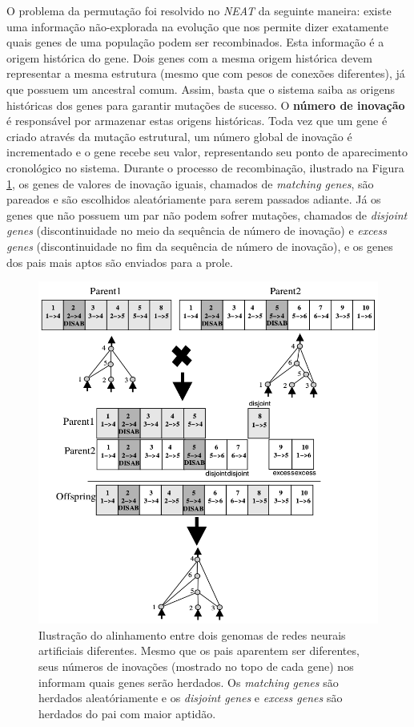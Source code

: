 O problema da permutação foi resolvido no \textit{NEAT} da seguinte maneira:
existe uma informação não-explorada na evolução que nos permite dizer exatamente
quais genes de uma população podem ser recombinados. Esta informação é a origem
histórica do gene. Dois genes com a mesma origem histórica devem representar a
mesma estrutura (mesmo que com pesos de conexões diferentes), já que possuem um
ancestral comum. Assim, basta que o sistema saiba as origens históricas dos
genes para garantir mutações de sucesso.  O \textbf{número de inovação} é
responsável por armazenar estas origens históricas.  Toda vez que um gene é
criado através da mutação estrutural, um número global de inovação é
incrementado e o gene recebe seu valor, representando seu ponto de aparecimento
cronológico no sistema.  Durante o processo de recombinação, ilustrado na Figura
\ref{fig:neat-innovation-matchup}, os genes de valores de inovação iguais,
chamados de \textit{matching genes}, são pareados e são escolhidos
aleatóriamente para serem passados adiante. Já os genes que não possuem um par
não podem sofrer mutações, chamados de \textit{disjoint genes} (discontinuidade
no meio da sequência de número de inovação) e \textit{excess genes}
(discontinuidade no fim da sequência de número de inovação), e os genes dos pais
mais aptos são enviados para a prole.

\begin{figure}[H]
\centering
\includegraphics[width=\textwidth]{fig/neat-crossover-example.png}
\caption{Ilustração do alinhamento entre dois genomas de redes neurais
artificiais diferentes. Mesmo que os pais aparentem ser diferentes, seus números
de inovações (mostrado no topo de cada gene) nos informam quais genes serão
herdados. Os \textit{matching genes} são herdados aleatóriamente e os
\textit{disjoint genes} e \textit{excess genes} são herdados do pai com maior
aptidão.}
\label{fig:neat-innovation-matchup}
\end{figure}


